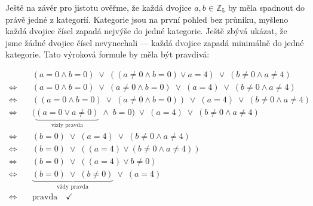 \documentclass[12pt]{article}
\begin{document}
\begin{enumerate}
      Ještě na závěr pro jistotu ověřme, že každá dvojice $a,b\in\mathbb{Z}_5$ by měla spadnout do právě jedné z kategorií.
      Kategorie jsou na první pohled bez průniku, myšleno každá dvojice čísel zapadá nejvýše do jedné kategorie. 
      Ještě zbývá ukázat, že jsme žádné dvojice čísel nevynechali --- každá dvojice zapadá minimálně do jedné kategorie.
      Tato výroková formule by měla být pravdivá:
      
      \[
        \begin{aligned}
        & (a = 0 \land b = 0)
          \;\lor\;
          ((a \neq 0 \land b = 0) \lor a = 4)
          \;\lor\;
          (b \neq 0 \land a \neq 4)
        \\
        \Longleftrightarrow\quad &
          (a = 0 \land b = 0)
          \;\lor\;
          (a \neq 0 \land b = 0)
          \;\lor\;
          (a = 4)
          \;\lor\;
          (b \neq 0 \land a \neq 4)
        \\
        \Longleftrightarrow\quad &
          \left((a = 0 \land b = 0)
          \;\lor\;
          (a \neq 0 \land b = 0)\right)
          \;\lor\;
          (a = 4)
          \;\lor\;
          (b \neq 0 \land a \neq 4)
        \\
        \Longleftrightarrow\quad &
          \bigl(\underbrace{(a = 0 \lor a \neq 0)}_{\text{vždy pravda}} \;\land\; b = 0\bigr)
          \;\lor\;
          (a = 4)
          \;\lor\;
          (b \neq 0 \land a \neq 4)
        \\
        \Longleftrightarrow\quad &
          (b = 0)
          \;\lor\;
          (a = 4)
        \;\lor\;
        (b \neq 0 \land a \neq 4)
        \\
        \Longleftrightarrow\quad &
          (b = 0)
          \;\lor\;
          \left((a = 4) \lor (b \neq 0 \land a \neq 4)\right)
        \\
        \Longleftrightarrow\quad &
          (b = 0)
          \;\lor\;
          \left((a = 4) \lor b \neq 0\right)
        \\
        \Longleftrightarrow\quad &
          \underbrace{(b = 0)
          \;\lor\;
          (b \neq 0)}_{\text{vždy pravda}}
          \;\lor\;
          (a = 4)
        \\
        \Longleftrightarrow\quad &
        \text{pravda} \quad \checkmark
        \end{aligned}
      \]



\end{enumerate}
\end{document}
